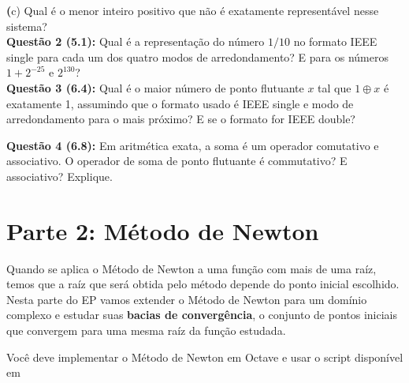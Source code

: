 \documentclass[12pt]{article}
\newcommand{\questao}[1] {\vspace{12pt} \noindent \large \textbf{Questão #1:} \normalsize}
\renewcommand{\part}[1] {\noindent\textbf (#1)}
\begin{document}
\part{c} Qual é o menor inteiro positivo que não é exatamente 
representável nesse sistema? \\

\questao{2 (5.1)}
Qual é a representação do número $1/10$ no formato IEEE single para
cada um dos quatro modos de arredondamento? E para os números 
$1 + 2^{-25}$ e $2^{130}$?\\

\questao{3 (6.4)}
Qual é o maior número de ponto flutuante $x$ tal que $1 \oplus x$ é
exatamente 1, assumindo que o formato usado é IEEE single e modo de 
arredondamento para o mais próximo? E se o formato for IEEE double?

\questao{4 (6.8)} Em aritmética exata, a soma é um operador
comutativo e associativo. O operador de soma de ponto flutuante é 
commutativo? E associativo? Explique.

\section {Parte 2: Método de Newton}
Quando se aplica o Método de Newton a uma função com mais de uma raíz,
temos que a raíz que será obtida pelo método depende do ponto inicial 
escolhido. Nesta parte do EP vamos extender o Método de Newton para um
domínio complexo e estudar suas \textbf{bacias de convergência}, o 
conjunto de pontos iniciais que convergem para uma mesma raíz da função
estudada.

Você deve implementar o Método de Newton em Octave e usar o script 
disponível em 
\end{document}
